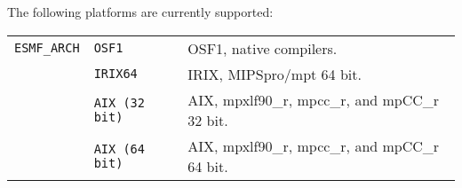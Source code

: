 

The following platforms are currently supported:

\begin{tabular}{lll}
{\tt ESMF\_ARCH}  & {\tt OSF1}      &  OSF1, native compilers. \\
                  & {\tt IRIX64}     &  IRIX, MIPSpro/mpt 64 bit. \\
                  & {\tt AIX (32 bit)}  &  AIX, mpxlf90\_r, mpcc\_r, and mpCC\_r 32 bit.  \\
                  & {\tt AIX (64 bit)}  &  AIX, mpxlf90\_r, mpcc\_r, and mpCC\_r
64 bit.  \\
\end{tabular}
